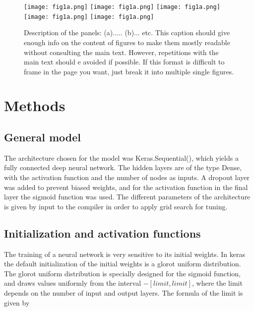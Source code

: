 \documentclass[prl,twocolumn]{revtex4-1}
\begin{document}
\begin{figure*}[!tb]
  \centering
  \texttt{[image: fig1a.png]}
  \hskip 1mm
  \texttt{[image: fig1a.png]}
  \hskip 1mm
  \texttt{[image: fig1a.png]}
  \vskip 1mm
  \texttt{[image: fig1a.png]}
  \hskip 1mm
  \texttt{[image: fig1a.png]}
  \caption{Description of the panels: (a)..... (b)... etc. This caption should give enough info on the content of figures to make them mostly readable without consulting the main text. However, repetitions with the main text should e avoided if possible. {\color{red} If this format is difficult to frame in the page you want, just break it into multiple single figures.}}
  \label{fig:x}
\end{figure*}

 \section{Methods}

\subsection{General model}
The architecture chosen for the model was Keras.Sequential(), which yields a fully connected deep neural network. The hidden layers are of the type Dense, with the activation function and the number of nodes as inputs. A dropout layer was added to prevent biased weights, and for the activation function in the final layer the sigmoid function was used. The different parameters of the architecture is given by input to the compiler in order to apply grid search for tuning.



\subsection{Initialization and activation functions}
The training of a neural network is very sensitive to its initial weights. In keras the default initialization of the initial weights is a glorot uniform distribution. The glorot uniform distribution is specially designed for the sigmoid function, and draws values uniformly from the interval $-[limit,limit]$, where the limit depends on the number of input and output layers. The formula of the limit is given by 

\begin{equation}
    
\end{equation}
\end{document}
